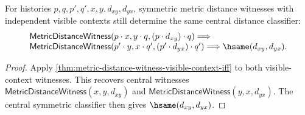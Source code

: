 \begin{theorem}
\label{thm:metric-distance-witness-visible-context-prefix-independent-symmetric-classifier}
For histories $p,q,p',q',x,y,d_{xy},d_{yx}$, symmetric metric distance
witnesses with independent visible contexts still determine the same central
distance classifier:
$$
\begin{array}{l}
\mathsf{MetricDistanceWitness}(p\cdot x,y\cdot q,(p\cdot d_{xy})\cdot q)
\Longrightarrow
\\
\mathsf{MetricDistanceWitness}(p'\cdot y,x\cdot q',(p'\cdot d_{yx})\cdot q')
\Longrightarrow
\hsame(d_{xy},d_{yx}).
\end{array}
$$
\end{theorem}
\begin{proof}
Apply \autoref{thm:metric-distance-witness-visible-context-iff} to both
visible-context witnesses. This recovers central witnesses
$\mathsf{MetricDistanceWitness}(x,y,d_{xy})$ and
$\mathsf{MetricDistanceWitness}(y,x,d_{yx})$. The central symmetric classifier
then gives $\hsame(d_{xy},d_{yx})$.
\end{proof}

